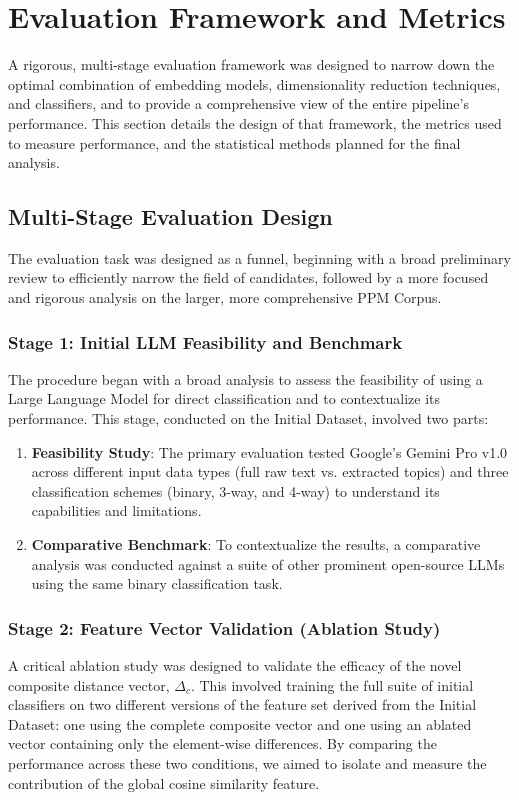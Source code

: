\section{Evaluation Framework and Metrics}\label{ch:3.4}
A rigorous, multi-stage evaluation framework was designed to narrow down the optimal combination of embedding models, dimensionality reduction techniques, and classifiers, and to provide a comprehensive view of the entire pipeline's performance. This section details the design of that framework, the metrics used to measure performance, and the statistical methods planned for the final analysis.

\subsection{Multi-Stage Evaluation Design}\label{ch:3.4.1}
The evaluation task was designed as a funnel, beginning with a broad preliminary review to efficiently narrow the field of candidates, followed by a more focused and rigorous analysis on the larger, more comprehensive PPM Corpus.

\subsubsection{Stage 1: Initial LLM Feasibility and Benchmark}
The procedure began with a broad analysis to assess the feasibility of using a Large Language Model for direct classification and to contextualize its performance. This stage, conducted on the Initial Dataset, involved two parts:
\begin{enumerate}
    \item \textbf{Feasibility Study}: The primary evaluation tested Google's Gemini Pro v1.0 across different input data types (full raw text vs. extracted topics) and three classification schemes (binary, 3-way, and 4-way) to understand its capabilities and limitations.
    \item \textbf{Comparative Benchmark}: To contextualize the results, a comparative analysis was conducted against a suite of other prominent open-source LLMs using the same binary classification task.
\end{enumerate}

\subsubsection{Stage 2: Feature Vector Validation (Ablation Study)}\label{ch:3.4.1.1}
A critical ablation study was designed to validate the efficacy of the novel composite distance vector, \(\Delta_c\). This involved training the full suite of initial classifiers on two different versions of the feature set derived from the Initial Dataset: one using the complete composite vector and one using an ablated vector containing only the element-wise differences. By comparing the performance across these two conditions, we aimed to isolate and measure the contribution of the global cosine similarity feature.

